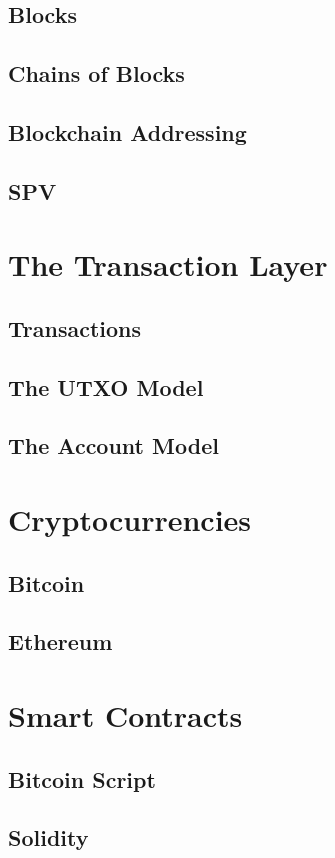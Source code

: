 \subsection{Blocks}
\subsection{Chains of Blocks}
\subsection{Blockchain Addressing}
\subsection{SPV}

\section{The Transaction Layer}
\subsection{Transactions}
\subsection{The UTXO Model}
\subsection{The Account Model}

\section{Cryptocurrencies}

\subsection{Bitcoin}
\subsection{Ethereum}

\section{Smart Contracts}
\subsection{Bitcoin Script}
\subsection{Solidity}

